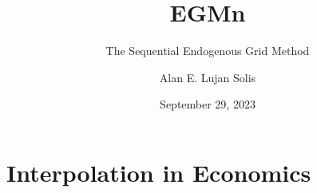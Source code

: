 \documentclass[
  letterpaper,
  DIV=11,
  numbers=noendperiod]{scrartcl}
\title{EGMn}
\subtitle{The Sequential Endogenous Grid Method}
\author{Alan E. Lujan Solis}
\date{September 29, 2023}
\begin{document}
\maketitle
\ifdefined\Shaded\renewenvironment{Shaded}{\begin{tcolorbox}[boxrule=0pt, frame hidden, breakable, sharp corners, enhanced, borderline west={3pt}{0pt}{shadecolor}, interior hidden]}{\end{tcolorbox}}\fi

\hypertarget{interpolation-in-economics}{%
\section{Interpolation in Economics}\label{interpolation-in-economics}}

\[
\newcommand{\DiscFac}{\beta}
\newcommand{\utilFunc}{\mathrm{u}}
\newcommand{\VFunc}{\mathrm{V}}
\newcommand{\Leisure}{Z}
\newcommand{\tShk}{\xi}
\newcommand{\util}{u}
\newcommand{\tShkEmp}{\theta}
\newcommand{\BLev}{B}
\newcommand{\CLev}{C}
\newcommand{\MLev}{M}
\newcommand{\ALev}{A}
\newcommand{\Ex}{\mathbb{E}}
\newcommand{\CRRA}{\rho}
\newcommand{\labShare}{\nu}
\newcommand{\leiShare}{\zeta}
\newcommand{\h}{h}
\newcommand{\bRat}{b}
\newcommand{\leisure}{z}
\newcommand{\cRat}{c}
\newcommand{\PLev}{P}
\newcommand{\vFunc}{\mathrm{v}}
\newcommand{\Rfree}{\mathsf{R}}
\newcommand{\wage}{\mathsf{w}}
\newcommand{\riskyshare}{\varsigma}
\newcommand{\PGro}{\Gamma}
\newcommand{\labor}{\ell}
\newcommand{\aRat}{a}
\newcommand{\mRat}{m}
\newcommand{\Rport}{\mathbb{R}}
\newcommand{\Risky}{\mathbf{R}}
\newcommand{\risky}{\mathbf{r}}
\newcommand{\vOpt}{\tilde{\mathfrak{v}}}
\newcommand{\vEnd}{\mathfrak{v}}
\newcommand{\vE}{{v}^{e}}
\newcommand{\vOptAlt}{\grave{\tilde{\mathfrak{v}}}}
\newcommand{\q}{\koppa}
\newcommand{\cEndFunc}{\mathfrak{c}}
\newcommand{\cE}{\cRat^{e}}
\newcommand{\xRat}{x}
\newcommand{\aMat}{[\mathrm{a}]}
\newcommand{\mEndFunc}{\mathfrak{m}}
\newcommand{\mE}{\mRat^{e}}
\newcommand{\mMat}{[\mathrm{m}]}
\newcommand{\tShkMat}{[\mathrm{\tShkEmp}]}
\newcommand{\zEndFunc}{\mathfrak{z}}
\newcommand{\lEndFunc}{\mathfrak{l}}
\newcommand{\bEndFunc}{\mathfrak{b}}
\newcommand{\bE}{\bRat^{e}}
\newcommand{\nRat}{n}
\newcommand{\dRat}{d}
\newcommand{\gFunc}{\mathrm{g}}
\newcommand{\xFer}{\chi}
\newcommand{\lRat}{l}
\newcommand{\wFunc}{\mathrm{w}}
\newcommand{\dEndFunc}{\mathfrak{d}}
\newcommand{\nEndFunc}{\mathfrak{n}}
\newcommand{\uFunc}{\mathrm{u}}
\newcommand{\TFunc}{\mathrm{T}}
\newcommand{\UFunc}{\mathrm{U}}
\newcommand{\WFunc}{\mathrm{W}}
\newcommand{\yRat}{y}
\newcommand{\XLev}{X}
\newcommand{\Retire}{\mathbb{R}}
\newcommand{\Work}{\mathbb{W}}
\newcommand{\error}{\epsilon}
\newcommand{\err}{z}
\newcommand{\kapShare}{\alpha}
\newcommand{\kap}{k}
\newcommand{\cTarg}{\check{c}}
\newcommand{\Decision}{\mathbb{D}}
\newcommand{\Prob}{\mathbb{P}}
\]
\end{document}
